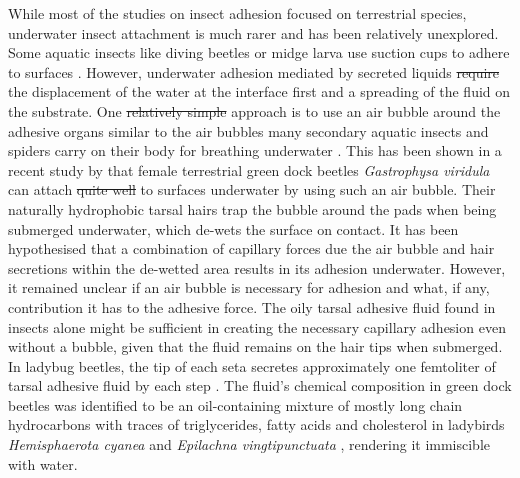 \documentclass[vruler,JEB]{COB}%
\providecommand{\DIFadd}[1]{{\protect\color{blue}\uwave{#1}}} %
\providecommand{\DIFdel}[1]{{\protect\color{red}\sout{#1}}}                      %
\providecommand{\DIFaddbegin}{} %
\providecommand{\DIFaddend}{} %
\providecommand{\DIFdelbegin}{} %
\providecommand{\DIFdelend}{} %
\begin{document}
While most of the studies on insect adhesion focused on terrestrial species, underwater insect attachment is much rarer and has been relatively unexplored. Some aquatic insects like diving beetles \citep{Chen:2014} or midge larva \citep{Kang:2020} use suction cups to adhere to surfaces \DIFaddbegin \DIFadd{\mbox{%
\citep{DITSCHEKURU2012379,RN123}}\hspace{0pt}%
}\DIFaddend . However, underwater adhesion mediated by secreted liquids \DIFdelbegin \DIFdel{require }\DIFdelend \DIFaddbegin \DIFadd{requires }\DIFaddend the displacement of the water at the interface first and a spreading of the fluid on the substrate. One \DIFdelbegin \DIFdel{relatively simple }\DIFdelend approach is to use an air bubble around the adhesive organs similar to the air bubbles many secondary aquatic insects and spiders carry on their body for breathing underwater \citep{Seymour:2013}. This has been shown in a recent study by \citet{RN87} that female terrestrial green dock beetles \emph{Gastrophysa viridula} can attach \DIFdelbegin \DIFdel{quite well }\DIFdelend to surfaces underwater by using such an air bubble. Their naturally hydrophobic tarsal hairs trap the bubble around the pads when being submerged underwater, which de-wets the surface on contact. It has been hypothesised that a combination of capillary forces due the air bubble and hair secretions within the de-wetted area results in its adhesion underwater. However, it remained unclear if an air bubble is necessary for adhesion and what, if any, contribution it has to the adhesive force. The oily tarsal adhesive fluid found in insects alone might be sufficient in creating the necessary capillary adhesion even without a bubble, given that the fluid remains on the hair tips when submerged. In ladybug beetles, the tip of each seta secretes approximately one femtoliter of tarsal adhesive fluid by each step \citep{RN108}. The fluid's chemical composition in green dock beetles was identified to be an oil-containing mixture of mostly long chain hydrocarbons\citep{RN96} with traces
of triglycerides, fatty acids and cholesterol in ladybirds \emph{Hemisphaerota cyanea} \citep{RN221} and \emph{Epilachna vingtipunctuata} \citep{RN222}, rendering it immiscible with water.
\end{document}
